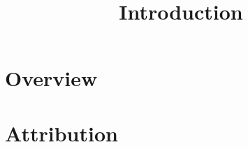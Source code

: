 

%


\title{Introduction}


\maketitle

\label{section-phantom}

\tableofcontents


\section{Overview}
\label{section-overview}

\section{Attribution}
\label{section-attribution}








